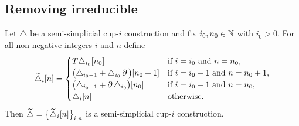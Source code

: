\subsection{Removing irreducible}

\begin{lemma}\label{st:transposing}
	Let $\triangle$ be a semi-simplicial \mbox{cup-$i$} construction and fix $i_0, n_0 \in \N$ with $i_0 > 0$.
	For all non-negative integers $i$ and $n$ define
	\[
	\widetilde\triangle_i[n] =
	\begin{cases}
		T\triangle_{i_0}[n_0] & \text{if }i=i_0 \text{ and } n=n_0, \\
		\big(\triangle_{i_0-1} + \triangle_{i_0}\bd\big)[n_0+1] & \text{if }i=i_0-1 \text{ and } n=n_0+1, \\
		\big(\triangle_{i_0-1} + \bd\triangle_{i_0}\big)[n_0] & \text{if }i=i_0-1 \text{ and } n=n_0, \\
		\triangle_{i}[n] & \text{otherwise}.
	\end{cases}
	\]
	Then $\widetilde\triangle = \set[\big]{\widetilde\triangle_i[n]}_{i,n}$ is a semi-simplicial \mbox{cup-$i$} construction.
\end{lemma}

